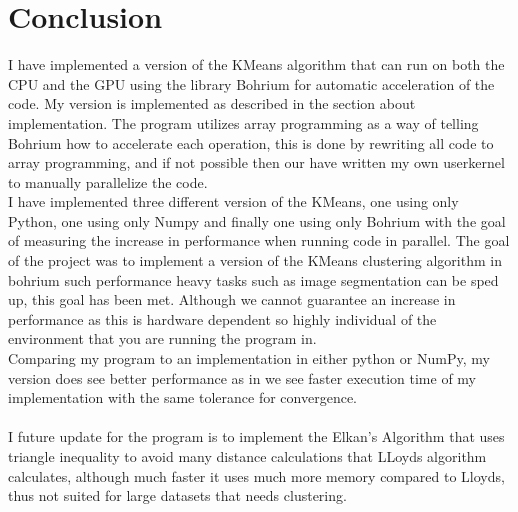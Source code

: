 \documentclass[12pt]{report}
\begin{document}
\chapter{Conclusion}
\label{sec:label}
I have implemented a version of the KMeans algorithm that can run on both the CPU and the GPU using the library Bohrium for automatic acceleration of the code. My version is implemented as described in the section about implementation. The program utilizes array programming as a way of telling Bohrium how to accelerate each operation, this is done by rewriting all code to array programming, and if not possible then our have written my own userkernel to manually parallelize the code. \\
I have implemented three different version of the KMeans, one using only Python, one using only Numpy and finally one using only Bohrium with the goal of measuring the increase in performance when running code in parallel. The goal of the project was to implement a version of the KMeans clustering algorithm in bohrium such performance heavy tasks such as image segmentation can be sped up, this goal has been met. Although we cannot guarantee an increase in performance as this is hardware dependent so highly individual of the environment that you are running the program in. \\
Comparing my program to an implementation in either python or NumPy, my version does see better performance as in we see faster execution time of my implementation with the same tolerance for convergence. \\ \\

I future update for the program is to implement the Elkan's Algorithm that uses triangle inequality to avoid many distance calculations that LLoyds algorithm calculates, although much faster it uses much more memory compared to Lloyds, thus not suited for large datasets that needs clustering.


\newpage


\end{document}
